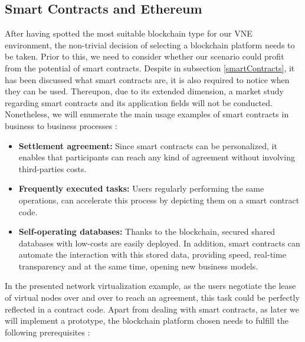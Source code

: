 \subsection{Smart Contracts and Ethereum} \label{smartContractsAndEthereum}

After having spotted the most suitable blockchain type for our VNE environment, the non-trivial decision of selecting a blockchain platform needs to be taken. Prior to this, we need to consider whether our scenario could profit from the potential of smart contracts. Despite in subsection \ref{smartContracts}, it has been discussed what smart contracts are, it is also required to notice when they can be used. Thereupon, due to its extended dimension, a market study regarding smart contracts and its application fields will not be conducted. Nonetheless, we will enumerate the main usage examples of smart contracts in business to business processes \citep{blockchainBerkeley}:

\begin{itemize}
	\item \textbf{Settlement agreement:} Since smart contracts can be personalized, it enables that participants can reach any kind of agreement without involving third-parties costs.
	\item \textbf{Frequently executed tasks:} Users regularly performing the same operations, can accelerate this process by depicting them on a smart contract code.
	\item \textbf{Self-operating databases:} Thanks to the blockchain, secured shared databases with low-costs are easily deployed. In addition, smart contracts can automate the interaction with this stored data, providing speed, real-time transparency and at the same time, opening new business models. 
\end{itemize}

In the presented network virtualization example, as the users negotiate the lease of virtual nodes over and over to reach an agreement, this task could be perfectly reflected in a contract code. Apart from dealing with smart contracts, as later we will implement a prototype, the blockchain platform chosen needs to fulfill the following prerequisites \citep{macdonald2017}: 

